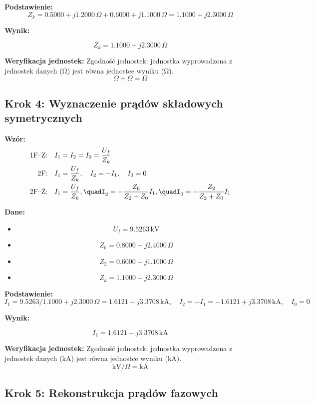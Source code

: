 \documentclass[11pt,a4paper]{article}
\begin{document}
\textbf{Podstawienie:}
$$
Z_k = 0.5000 + j1.2000\,\Omega + 0.6000 + j1.1000\,\Omega = 1.1000 + j2.3000\,\Omega
$$

\textbf{Wynik:}
\begin{center}
$$
Z_k = 1.1000 + j2.3000\,\Omega
$$
\end{center}

\textbf{Weryfikacja jednostek:} Zgodność jednostek: jednostka wyprowadzona z jednostek danych (Ω) jest równa jednostce wyniku (Ω).
$$
\Omega + \Omega = \Omega
$$

\subsection{Krok 4: Wyznaczenie prądów składowych symetrycznych}

\textbf{Wzór:}
$$
\begin{aligned}\text{1F–Z:} \quad & I_1 = I_2 = I_0 = \frac{U_f}{Z_k} \\\text{2F:} \quad & I_1 = \frac{U_f}{Z_k}, \quad I_2 = -I_1, \quad I_0 = 0 \\\text{2F–Z:} \quad & I_1 = \frac{U_f}{Z_k}, \quadI_2 = -\frac{Z_0}{Z_2 + Z_0} I_1, \quadI_0 = -\frac{Z_2}{Z_2 + Z_0} I_1\end{aligned}
$$

\textbf{Dane:}
\begin{itemize}
  \item
$$
U_f = 9.5263\,\mathrm{kV}
$$
  \item
$$
Z_0 = 0.8000 + j2.4000\,\Omega
$$
  \item
$$
Z_2 = 0.6000 + j1.1000\,\Omega
$$
  \item
$$
Z_k = 1.1000 + j2.3000\,\Omega
$$
\end{itemize}

\textbf{Podstawienie:}
$$
I_1 = 9.5263 / 1.1000 + j2.3000\,\Omega = 1.6121 - j3.3708\,\mathrm{kA}, \quad I_2 = -I_1 = -1.6121 + j3.3708\,\mathrm{kA}, \quad I_0 = 0
$$

\textbf{Wynik:}
\begin{center}
$$
I_1 = 1.6121 - j3.3708\,\mathrm{kA}
$$
\end{center}

\textbf{Weryfikacja jednostek:} Zgodność jednostek: jednostka wyprowadzona z jednostek danych (kA) jest równa jednostce wyniku (kA).
$$
\mathrm{kV}/\Omega = \mathrm{kA}
$$

\subsection{Krok 5: Rekonstrukcja prądów fazowych}
\end{document}
